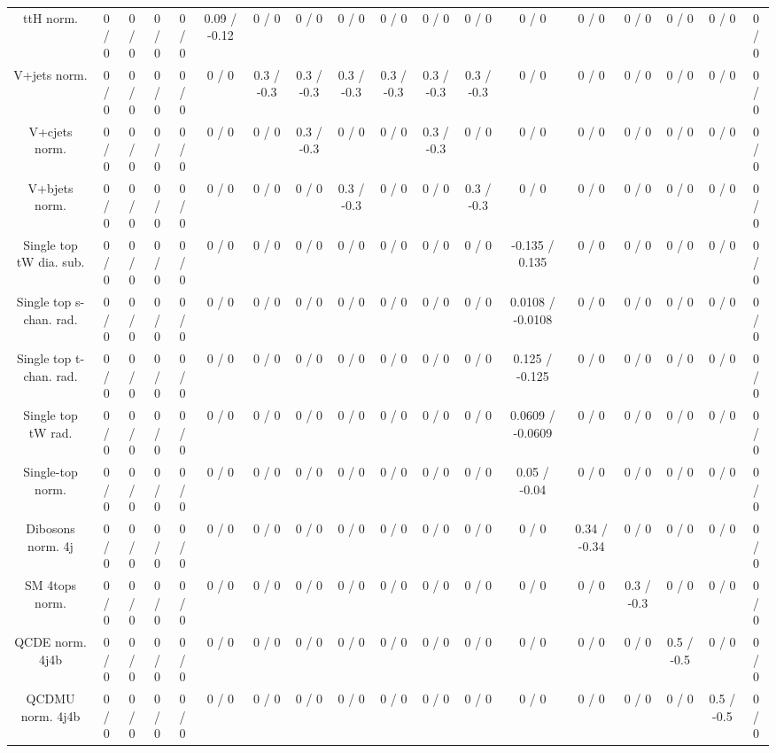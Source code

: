 \documentclass[10pt]{article}
\begin{document}
\begin{table}[htbp]
\begin{center}
\begin{tabular}{|c|c|c|c|c|c|c|c|c|c|c|c|c|c|c|c|c|c|}
  ttH norm. & 0 / 0 & 0 / 0 & 0 / 0 & 0 / 0 & 0.09 / -0.12 & 0 / 0 & 0 / 0 & 0 / 0 & 0 / 0 & 0 / 0 & 0 / 0 & 0 / 0 & 0 / 0 & 0 / 0 & 0 / 0 & 0 / 0 & 0 / 0 \\ 
  V+jets norm. & 0 / 0 & 0 / 0 & 0 / 0 & 0 / 0 & 0 / 0 & 0.3 / -0.3 & 0.3 / -0.3 & 0.3 / -0.3 & 0.3 / -0.3 & 0.3 / -0.3 & 0.3 / -0.3 & 0 / 0 & 0 / 0 & 0 / 0 & 0 / 0 & 0 / 0 & 0 / 0 \\ 
  V+cjets norm. & 0 / 0 & 0 / 0 & 0 / 0 & 0 / 0 & 0 / 0 & 0 / 0 & 0.3 / -0.3 & 0 / 0 & 0 / 0 & 0.3 / -0.3 & 0 / 0 & 0 / 0 & 0 / 0 & 0 / 0 & 0 / 0 & 0 / 0 & 0 / 0 \\ 
  V+bjets norm. & 0 / 0 & 0 / 0 & 0 / 0 & 0 / 0 & 0 / 0 & 0 / 0 & 0 / 0 & 0.3 / -0.3 & 0 / 0 & 0 / 0 & 0.3 / -0.3 & 0 / 0 & 0 / 0 & 0 / 0 & 0 / 0 & 0 / 0 & 0 / 0 \\ 
  Single top tW dia. sub. & 0 / 0 & 0 / 0 & 0 / 0 & 0 / 0 & 0 / 0 & 0 / 0 & 0 / 0 & 0 / 0 & 0 / 0 & 0 / 0 & 0 / 0 & -0.135 / 0.135 & 0 / 0 & 0 / 0 & 0 / 0 & 0 / 0 & 0 / 0 \\ 
  Single top s-chan. rad. & 0 / 0 & 0 / 0 & 0 / 0 & 0 / 0 & 0 / 0 & 0 / 0 & 0 / 0 & 0 / 0 & 0 / 0 & 0 / 0 & 0 / 0 & 0.0108 / -0.0108 & 0 / 0 & 0 / 0 & 0 / 0 & 0 / 0 & 0 / 0 \\ 
  Single top t-chan. rad. & 0 / 0 & 0 / 0 & 0 / 0 & 0 / 0 & 0 / 0 & 0 / 0 & 0 / 0 & 0 / 0 & 0 / 0 & 0 / 0 & 0 / 0 & 0.125 / -0.125 & 0 / 0 & 0 / 0 & 0 / 0 & 0 / 0 & 0 / 0 \\ 
  Single top tW rad. & 0 / 0 & 0 / 0 & 0 / 0 & 0 / 0 & 0 / 0 & 0 / 0 & 0 / 0 & 0 / 0 & 0 / 0 & 0 / 0 & 0 / 0 & 0.0609 / -0.0609 & 0 / 0 & 0 / 0 & 0 / 0 & 0 / 0 & 0 / 0 \\ 
  Single-top norm. & 0 / 0 & 0 / 0 & 0 / 0 & 0 / 0 & 0 / 0 & 0 / 0 & 0 / 0 & 0 / 0 & 0 / 0 & 0 / 0 & 0 / 0 & 0.05 / -0.04 & 0 / 0 & 0 / 0 & 0 / 0 & 0 / 0 & 0 / 0 \\ 
  Dibosons norm. 4j & 0 / 0 & 0 / 0 & 0 / 0 & 0 / 0 & 0 / 0 & 0 / 0 & 0 / 0 & 0 / 0 & 0 / 0 & 0 / 0 & 0 / 0 & 0 / 0 & 0.34 / -0.34 & 0 / 0 & 0 / 0 & 0 / 0 & 0 / 0 \\ 
  SM 4tops norm. & 0 / 0 & 0 / 0 & 0 / 0 & 0 / 0 & 0 / 0 & 0 / 0 & 0 / 0 & 0 / 0 & 0 / 0 & 0 / 0 & 0 / 0 & 0 / 0 & 0 / 0 & 0.3 / -0.3 & 0 / 0 & 0 / 0 & 0 / 0 \\ 
  QCDE norm. 4j4b & 0 / 0 & 0 / 0 & 0 / 0 & 0 / 0 & 0 / 0 & 0 / 0 & 0 / 0 & 0 / 0 & 0 / 0 & 0 / 0 & 0 / 0 & 0 / 0 & 0 / 0 & 0 / 0 & 0.5 / -0.5 & 0 / 0 & 0 / 0 \\ 
  QCDMU norm. 4j4b & 0 / 0 & 0 / 0 & 0 / 0 & 0 / 0 & 0 / 0 & 0 / 0 & 0 / 0 & 0 / 0 & 0 / 0 & 0 / 0 & 0 / 0 & 0 / 0 & 0 / 0 & 0 / 0 & 0 / 0 & 0.5 / -0.5 & 0 / 0 \\ 

\end{tabular}
\end{center}
\end{table}
\end{document}
